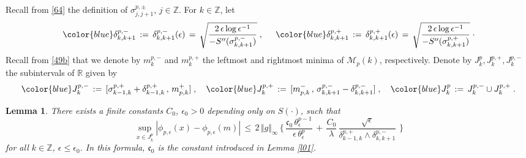 \documentclass[reqno]{amsart}
\theoremstyle{plain}
\newtheorem{lemma}[theorem]{Lemma}
\theoremstyle{definition}
\newcommand{\mf}[1]{{\mathfrak #1}}
\newcommand{\bb}[1]{{\mathbb #1}}
\newcommand{\ms}[1]{{\mathscr #1}}
\newcommand{\<}{\langle}
\renewcommand{\>}{\rangle}
\begin{document}
Recall from \eqref{64} the definition of $\sigma^{p,\pm}_{j, j+1} $,
$j\in \bb Z$. For $k\in \bb Z$, let
\begin{equation}
\label{21}
{\color{blue} \delta^{p,-}_{k,k+1}}\,: = \, \delta^{p,-}_{k,k+1}
(\epsilon) \,=\,
\sqrt{\frac{2 \,\epsilon \log
\epsilon^{-1}}{-S''(\sigma^{p,-}_{k,k+1})}}\;,
\hspace{5mm}
{\color{blue} \delta^{p,+}_{k,k+1} } \,:=\, \delta^{p,+}_{k,k+1}
(\epsilon) \,=\,
\sqrt{\frac{2 \, \epsilon \log
\epsilon^{-1}}{- S''(\sigma^{p,+}_{k,k+1})}} \;\cdot
\end{equation}
Recall from \eqref{49b} that we denote by $m^{p,-}_{k}$ and
$m^{p,+}_{k}$ the leftmost and rightmost minima of $\ms M_{p}(k)$,
respectively.  Denote by $J^{p}_{k}, J^{p,+}_{k}, J^{p,-}_{k}$ the
subintervals of $\bb R$ given by
\begin{gather*}
{\color{blue}   J^{p,-}_{k} } \,:= \,
[\sigma^{p,+}_{k-1,k} + \delta^{p,+}_{k-1,k} \,,\,
m^{+}_{p,k}]\;, \quad 
{\color{blue}    J^{p,+}_{k}} \, := \, [m^{-}_{p,k} \,,\, \sigma^{p,-}_{k,k+1} -
\delta^{p,-}_{k,k+1}]\;, \quad
{\color{blue}   J^{p}_{k}} \,:= \, J^{p,-}_{k} \cup J^{p,+}_{k}\;.
\end{gather*}

\begin{lemma}
\label{l14}
There exists a finite constants $C_0$, $\epsilon_0>0$ depending only
on $S(\cdot)$, such that
\begin{equation*}
\sup_{x\in  J^p_k}
|\phi_{p,\epsilon}(x) - \phi_{p,\epsilon}(m)| \,\le\,
2\, \Vert g \Vert_\infty\, \Big\{\,
\frac{\mf c_0 \, \theta_\epsilon^{p-1}}{\epsilon\, \theta_\epsilon^p}
\,+\, \frac{C_0}{\lambda} \,
\frac{\sqrt{\epsilon}}
{\delta^{p,+}_{k-1,k}  \wedge \delta^{p,-}_{k,k+1}  }\,
\,\Big\}
\end{equation*}
for all $k\in\bb Z$, $\epsilon\le \epsilon_0$. In this formula,
$\mf c_0$ is the constant introduced in Lemma \ref{l01}.
\end{lemma}
\end{document}
